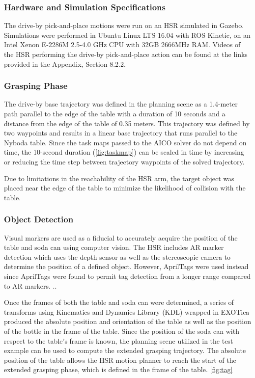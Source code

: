 \documentclass[11pt]{article}
\begin{document}
            \subsubsection{Hardware and Simulation Specifications}
                The drive-by pick-and-place motions were run on an HSR simulated in Gazebo. Simulations were performed in Ubuntu Linux LTS 16.04 with ROS Kinetic, on an Intel Xenon E-2286M 2.5-4.0 GHz CPU with 32GB 2666MHz RAM. Videos of the HSR performing the drive-by pick-and-place action can be found at the links provided in the Appendix, Section 8.2.2.
                
            \subsubsection{Grasping Phase}
                The drive-by base trajectory was defined in the planning scene as a 1.4-meter path parallel to the edge of the table with a duration of 10 seconds and a distance from the edge of the table of 0.35 meters. This trajectory was defined by two waypoints and results in a linear base trajectory that runs parallel to the Nyboda table. Since the task maps passed to the AICO solver do not depend on time, the 10-second duration (\cref{fig:taskmap}) can be scaled in time by increasing or reducing the time step between trajectory waypoints of the solved trajectory.

                \par Due to limitations in the reachability of the HSR arm, the target object was placed near the edge of the table to minimize the likelihood of collision with the table.

            \subsubsection{Object Detection}
                Visual markers are used as a fiducial to accurately acquire the position of the table and soda can using computer vision.
                The HSR includes AR marker detection which uses the depth sensor as well as the stereoscopic camera to determine the position of a defined object. However, AprilTags were used instead since AprilTags were found to permit tag detection from a longer range compared to AR markers. \cite{wang_apriltag_2016}.. 

                \par Once the frames of both the table and soda can were determined, a series of transforms using Kinematics and Dynamics Library (KDL)\cite{noauthor_kinematics_nodate} wrapped in EXOTica produced the absolute position and orientation of the table as well as the position of the bottle in the frame of the table. Since the position of the soda can with respect to the table's frame is known, the planning scene utilized in the test example can be used to compute the extended grasping trajectory.
                The absolute position of the table allows the HSR motion planner to reach the start of the extended grasping phase, which is defined in the frame of the table. \cref{fig:tag}
\end{document}
